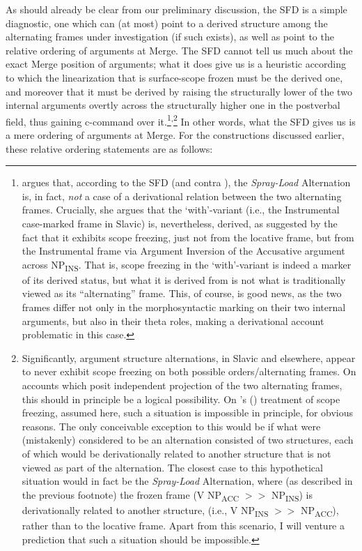 \documentclass[output=paper,colorlinks,citecolor=brown]{langscibook}
\begin{document}
As should already be clear from our preliminary discussion, the SFD is a simple diagnostic, one which can (at most) point to a derived structure among the alternating frames under investigation (if such exists), as well as point to the relative ordering of arguments at Merge. The SFD cannot tell us much about the exact Merge position of arguments; what it does give us is a heuristic according to which the linearization that is surface-scope frozen must be the derived one, and moreover that it must be derived by raising the structurally lower of the two internal arguments overtly across the structurally higher one in the postverbal field, thus gaining c-command over it.\footnote{\citet{AntonyukUnderReview} argues that, according to the SFD (and contra \citealt{Antonyuk2015}), the \textit{Spray-Load} Alternation is, in fact, \textit{not} a case of a derivational relation between the two alternating frames. Crucially, she argues that the `with'-variant (i.e., the Instrumental case-marked frame in Slavic) is, nevertheless, derived, as suggested by the fact that it exhibits scope freezing, just not from the locative frame, but from the Instrumental frame via Argument Inversion of the Accusative argument across NP\textsubscript{INS}. That is, scope freezing in the `with'-variant is indeed a marker of its derived status, but what it is derived from is not what is traditionally viewed as its “alternating” frame. This, of course, is good news, as the two frames differ not only in the morphosyntactic marking on their two internal arguments, but also in their theta roles, making a derivational account problematic in this case.}\textsuperscript{,}\footnote{Significantly, argument structure alternations, in Slavic and elsewhere, appear to never exhibit scope freezing on both possible orders/alternating frames. On accounts which posit independent projection of the two alternating frames, this should in principle be a logical possibility. On \citeauthor{Antonyuk2015}'s (\citeyear{Antonyuk2015}) treatment of scope freezing, assumed here, such a situation is impossible in principle, for obvious reasons. The only conceivable exception to this would be if what were (mistakenly) considered to be an alternation consisted of two structures, each of which would be derivationally related to another structure that is not viewed as part of the alternation. The closest case to this hypothetical situation would in fact be the \textit{Spray-Load} Alternation, where (as described in the previous footnote) the frozen frame (V NP\textsubscript{ACC} $>>$ NP\textsubscript{INS}) is derivationally related to another structure, (i.e., V NP\textsubscript{INS} $>>$ NP\textsubscript{ACC}), rather than to the locative frame. Apart from this scenario, I will venture a prediction that such a situation should be impossible.\label{ft:antonyuk:14}} In other words, what the SFD gives us is a mere ordering of arguments at Merge. For the constructions discussed earlier, these relative ordering statements are as follows:
\end{document}
